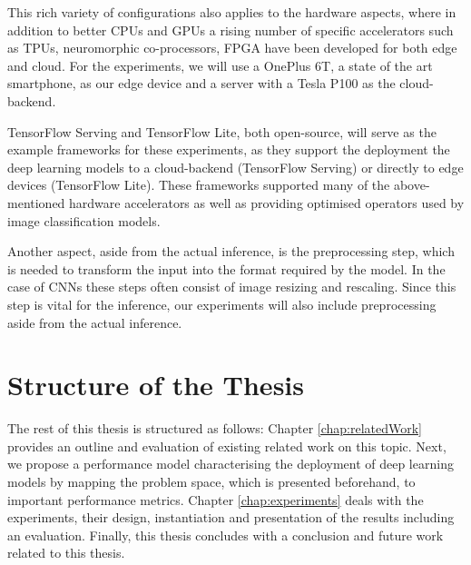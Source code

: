 This rich variety of configurations also applies to the hardware aspects, where in addition to better CPUs and GPUs a rising number of specific accelerators such as TPUs, neuromorphic co-processors, FPGA have been developed for both edge and cloud.
For the experiments, we will use a OnePlus 6T, a state of the art smartphone, as our edge device and a server with a Tesla P100 as the cloud-backend.


TensorFlow Serving and TensorFlow Lite, both open-source, will serve as the example frameworks for these experiments, as they support the deployment the deep learning models to a cloud-backend (TensorFlow Serving) or directly to edge devices (TensorFlow Lite). These frameworks supported many of the above-mentioned hardware accelerators as well as providing optimised operators used by image classification models.

Another aspect, aside from the actual inference, is the preprocessing step, which is needed to transform the input into the format required by the model. 
In the case of CNNs these steps often consist of image resizing and rescaling.
Since this step is vital for the inference, our experiments will also include preprocessing aside from the actual inference.

\section{Structure of the Thesis}
The rest of this thesis is structured as follows: Chapter \ref{chap:relatedWork} provides an outline and evaluation of existing related work on this topic. Next, we propose a performance model characterising the deployment of deep learning models by mapping the problem space, which is presented beforehand, to important performance metrics.
Chapter \ref{chap:experiments} deals with the experiments, their design, instantiation and presentation of the results including an evaluation.
Finally, this thesis concludes with a conclusion and future work related to this thesis.
